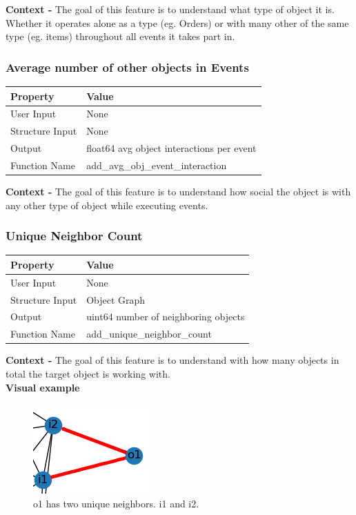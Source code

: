 \documentclass{article}
\begin{document}
\textbf{Context -} The goal of this feature is to understand what type of object it is. Whether it operates alone as a type (eg. Orders) or with many other of the same type (eg. items) throughout all events it takes part in.
\\

\subsubsection{Average number of other objects in Events} 
\begin{center}
	\begin{tabular}{| p{3cm} p{7cm} |}
		\hline
		\textbf{Property} & \textbf{Value}\\
		\hline
		User Input & None\\
		Structure Input & None\\
		Output & float64 avg object interactions per event\\
		Function Name & add\_avg\_obj\_event\_interaction\\
		\hline
	\end{tabular}
\end{center}

\textbf{Context -} The goal of this feature is to understand how social the object is with any other type of object while executing events. 
\\
\subsubsection{Unique Neighbor Count}
\begin{center}
	\begin{tabular}{| p{3cm} p{7cm} |}
		\hline
		\textbf{Property} & \textbf{Value}\\
		\hline
		User Input & None\\
		Structure Input & Object Graph\\
		Output & uint64 number of neighboring objects\\
		Function Name & add\_unique\_neighbor\_count\\
		\hline
	\end{tabular}
\end{center}

\textbf{Context -} The goal of this feature is to understand with how many objects in total the target object is working with.
\\

\textbf{Visual example}
\begin{figure}[h]
	\centering
	\includegraphics[scale=0.5]{images/obj-unc.png}
	\caption{o1 has two unique neighbors. i1 and i2.}
	\label{fig:obj-unc}
\end{figure}
\end{document}
